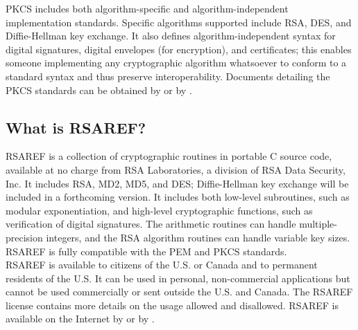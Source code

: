 PKCS includes both algorithm-specific and algorithm-independent
implementation standards. Specific algorithms supported include RSA,
DES, and Diffie-Hellman key exchange. It also defines
algorithm-independent syntax for digital signatures, digital envelopes
(for encryption), and certificates; this enables someone implementing
any cryptographic algorithm whatsoever to conform to a standard syntax
and thus preserve interoperability. Documents detailing the PKCS
standards can be obtained by  or by .

\subsection{What is RSAREF?}
\label{what_rsaref}

RSAREF is a collection of cryptographic routines in portable C source
code, available at no charge from RSA Laboratories, a division of RSA
Data Security, Inc. It includes RSA, MD2, MD5, and DES; Diffie-Hellman
key exchange will be included in a forthcoming version. It includes
both low-level subroutines, such as modular exponentiation, and
high-level cryptographic functions, such as verification of digital
signatures. The arithmetic routines can handle multiple-precision
integers, and the RSA algorithm routines can handle variable key sizes.
RSAREF is fully compatible with the PEM and PKCS standards.\\

RSAREF is available to citizens of the U.S. or Canada and to permanent
residents of the U.S. It can be used in personal, non-commercial
applications but cannot be used commercially or sent outside the U.S.
and Canada. The RSAREF license contains more details on the usage
allowed and disallowed. RSAREF is available on the Internet by
or by .
